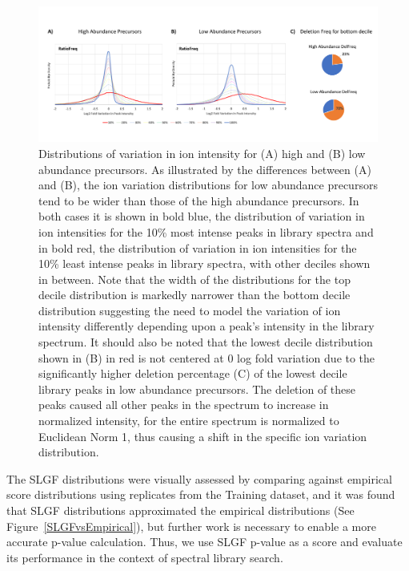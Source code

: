 \documentclass[endnotes,11pt]{article}
\begin{document}
\begin{figure}[h!]
 \centering
	\includegraphics[scale=0.33]{IonVariances4.pdf}
	\vspace{-0.5in}
  \caption{Distributions of variation in ion intensity for (A) high and (B) low abundance precursors. As illustrated by the differences between (A) and (B), the ion variation distributions for low abundance precursors tend to be wider than those of the high abundance precursors. In both cases it is shown in bold blue, the distribution of variation in ion intensities for the 10\% most intense peaks in library spectra and in bold red, the distribution of variation in ion intensities for the 10\% least intense peaks in library spectra, with other deciles shown in between. Note that the width of the distributions for the top decile distribution is markedly narrower than the bottom decile distribution suggesting the need to model the variation of ion intensity differently depending upon a peak's intensity in the library spectrum. It should also be noted that the lowest decile distribution shown in (B) in red is not centered at 0 log fold variation due to the significantly higher deletion percentage (C) of the lowest decile library peaks in low abundance precursors. The deletion of these peaks caused all other peaks in the spectrum to increase in normalized intensity, for the entire spectrum is normalized to Euclidean Norm 1, thus causing a shift in the specific ion variation distribution. }
	\label{IonVariances}
\end{figure}

The SLGF distributions were visually assessed by comparing against empirical score distributions using replicates from the Training dataset, and it was found that SLGF distributions approximated the empirical distributions (See Figure~\ref{SLGFvsEmpirical}), but further work is necessary to enable a more accurate p-value calculation. Thus, we use SLGF p-value as a score and evaluate its performance in the context of spectral library search.
\end{document}
